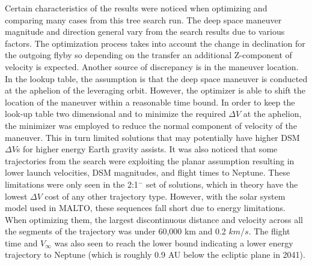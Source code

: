 \documentclass[letterpaper, paper,11pt]{./AAS}		%
\begin{document}
Certain characteristics of the results were noticed when optimizing and comparing many cases from this tree search run. The deep space maneuver magnitude and direction general vary from the search results due to various factors. The optimization process takes into account the change in declination for the outgoing flyby so depending on the transfer an additional Z-component of velocity is expected. Another source of discrepancy is in the maneuver location. In the lookup table, the assumption is that the deep space maneuver is conducted at the aphelion of the leveraging orbit. However, the optimizer is able to shift the location of the maneuver within a reasonable time bound. In order to keep the look-up table two dimensional and to minimize the required $\Delta V$ at the aphelion, the minimizer was employed to reduce the normal component of velocity of the maneuver. This in turn limited solutions that may potentially have higher DSM $\Delta V$s for higher energy Earth gravity assists. It was also noticed that some trajectories from the search were exploiting the planar assumption resulting in lower launch velocities, DSM magnitudes, and flight times to Neptune. These limitations were only seen in the 2:1$^{-}$ set of solutions, which in theory have the lowest $\Delta V$ cost of any other trajectory type. However, with the solar system model used in MALTO, these sequences fall short due to energy limitations. When optimizing them, the largest discontinuous distance and velocity across all the segments of the trajectory was under 60,000 km and 0.2 $km/s$. The flight time and $V_\infty$ was also seen to reach the lower bound indicating a lower energy trajectory to Neptune (which is roughly 0.9 AU below the ecliptic plane in 2041).
\end{document}
